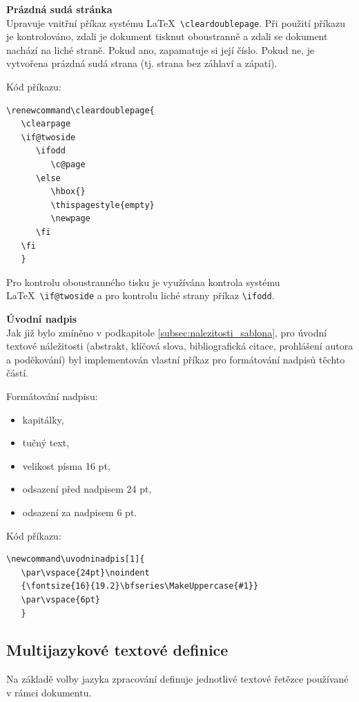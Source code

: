 \vspace{8pt}
\textbf{Prázdná sudá stránka}\\
Upravuje vnitřní příkaz systému \LaTeX\ \verb|\cleardoublepage|. Při použití příkazu je kontrolováno, zdali je dokument tisknut oboustranně a zdali se dokument nachází na liché straně. Pokud ano, zapamatuje si její číslo. Pokud ne, je vytvořena prázdná sudá strana (tj. strana bez záhlaví a zápatí).

Kód příkazu:

\begin{verbatim}
\renewcommand\cleardoublepage{
   \clearpage
   \if@twoside
      \ifodd
         \c@page
      \else
         \hbox{}
         \thispagestyle{empty}
         \newpage
      \fi
   \fi
   }
\end{verbatim}

Pro kontrolu oboustranného tisku je využívána kontrola systému \LaTeX\ \verb|\if@twoside| a pro kontrolu liché strany příkaz \verb|\ifodd|.

\vspace{8pt}

\textbf{Úvodní nadpis}\\
Jak již bylo zmíněno v podkapitole \ref{subsec:nalezitosti_sablona}, pro úvodní textové náležitosti (abstrakt, klíčová slova, bibliografická citace, prohlášení autora a poděkování) byl implementován vlastní příkaz pro formátování nadpisů těchto částí.

Formátování nadpisu:

\begin{itemize}[label=-]
	\item kapitálky,
	\item tučný text,
	\item velikost písma 16 pt,
	\item odsazení před nadpisem 24 pt,
	\item odsazení za nadpisem 6 pt.
\end{itemize}

Kód příkazu:

\begin{verbatim}
\newcommand\uvodninadpis[1]{
   \par\vspace{24pt}\noindent
   {\fontsize{16}{19.2}\bfseries\MakeUppercase{#1}}
   \par\vspace{6pt}
   }
\end{verbatim}

\subsection{Multijazykové textové definice}
\label{sec:texty}
Na základě volby jazyka zpracování definuje jednotlivé textové řetězce používané v rámci dokumentu.

